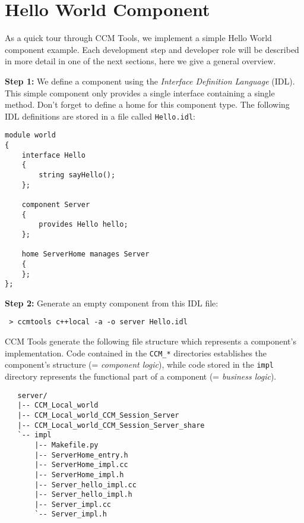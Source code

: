 \section{Hello World Component}
\label{HelloWorldComponent}

As a quick tour through CCM Tools, we implement a simple Hello World 
component example. Each development step and developer role will be described 
in more detail in one of the next sections, here we give a general overview.

\vspace{3mm}
\noindent
{\bf Step 1:} We define a component using the 
{\it Interface Definition Language} (IDL). 
This simple component only provides a single interface containing a single
method. Don't forget to define a home for this component type.
The following IDL definitions are stored in
a file called {\tt Hello.idl}:
\begin{small}
\begin{verbatim}
module world
{ 
    interface Hello 
    { 
        string sayHello(); 
    }; 

    component Server 
    { 
        provides Hello hello;
    }; 

    home ServerHome manages Server
    {
    };
};
\end{verbatim}
\end{small}

\noindent
{\bf Step 2:} Generate an empty component from this IDL file:
\begin{small}
\begin{verbatim}
 > ccmtools c++local -a -o server Hello.idl
\end{verbatim}
\end{small}

\noindent
CCM Tools generate the following file structure which represents a
component's implementation.
Code contained in the {\tt CCM\_*} directories establishes the component's
structure (= {\it component logic}), while code stored in the {\tt impl}
directory represents the functional part of a component (= {\it business
logic}).

\begin{small}
\begin{verbatim}
   server/
   |-- CCM_Local_world
   |-- CCM_Local_world_CCM_Session_Server
   |-- CCM_Local_world_CCM_Session_Server_share
   `-- impl
       |-- Makefile.py
       |-- ServerHome_entry.h
       |-- ServerHome_impl.cc
       |-- ServerHome_impl.h
       |-- Server_hello_impl.cc
       |-- Server_hello_impl.h
       |-- Server_impl.cc
       `-- Server_impl.h
\end{verbatim}
\end{small}

